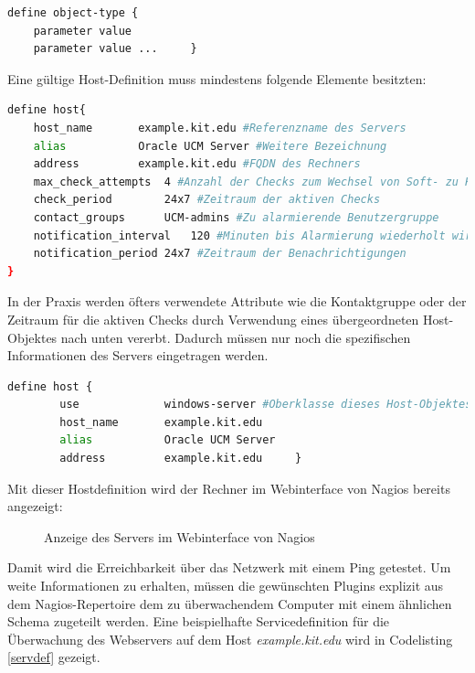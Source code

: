\begin{lstlisting}[captionpos=b, caption=Nagiosschema für Objektdefinitionen, label=schmeaobj, breaklines = false]
define object-type {
	parameter value
	parameter value ...		}
\end{lstlisting}


Eine gültige Host-Definition muss mindestens folgende Elemente besitzten:

\begin{lstlisting}[captionpos=b, caption=Definition eines Hostobjektes, label=hostobj, breaklines = true, language=sh]
define host{
	host_name		example.kit.edu #Referenzname des Servers
	alias			Oracle UCM Server #Weitere Bezeichnung
	address			example.kit.edu #FQDN des Rechners
	max_check_attempts	4 #Anzahl der Checks zum Wechsel von Soft- zu Hard-State
	check_period		24x7 #Zeitraum der aktiven Checks
	contact_groups		UCM-admins #Zu alarmierende Benutzergruppe
	notification_interval	120 #Minuten bis Alarmierung wiederholt wird
	notification_period	24x7 #Zeitraum der Benachrichtigungen
}
\end{lstlisting}

In der Praxis werden öfters verwendete Attribute wie die Kontaktgruppe oder der Zeitraum für die aktiven Checks durch Verwendung eines übergeordneten Host-Objektes nach unten vererbt.
Dadurch müssen nur noch die spezifischen Informationen des Servers eingetragen werden.
\begin{lstlisting}[captionpos=b, caption=Verkürzte Definition eines Hostobjektes, label=vhostobj, breaklines = true, language=sh]
define host {
        use             windows-server #Oberklasse dieses Host-Objektes
        host_name       example.kit.edu
        alias           Oracle UCM Server
        address         example.kit.edu		}
\end{lstlisting}

Mit dieser Hostdefinition wird der Rechner im Webinterface von Nagios bereits angezeigt:

\begin{figure}[ht]
	\centering
		\caption{Anzeige des Servers im Webinterface von Nagios}
		\label{check-swap}
\end{figure}

Damit wird die Erreichbarkeit über das Netzwerk mit einem Ping getestet.
Um weite Informationen zu erhalten, müssen die gewünschten Plugins explizit aus dem Nagios-Repertoire dem zu überwachendem Computer mit einem ähnlichen Schema zugeteilt werden.
Eine beispielhafte Servicedefinition für die Überwachung des Webservers auf dem Host \textit{example.kit.edu} wird in Codelisting \ref{servdef} gezeigt.

